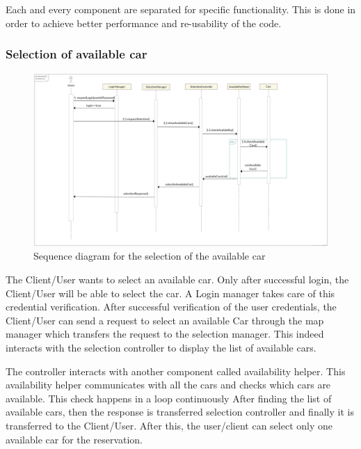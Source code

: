 Each and every component are separated for specific functionality. This is done in order to achieve better performance and re-usability of the code.

\subsubsection{Selection of available car}
\begin{figure}[h]
	\centering
	\includegraphics[width=\linewidth,keepaspectratio]{figures/selection_available_car_runtime.eps}
	\caption{Sequence diagram for the selection of the available car}
	\label{fig:selection_available_car_runtime}
\end{figure}

The Client/User wants to select an available car. Only after successful login, the Client/User will be able to select the car. A Login manager takes care of this credential verification.
After successful verification of the user credentials, the Client/User can send a request to select an available Car through the map manager which transfers the request to the selection
manager. This indeed interacts with the selection controller to display the list of available cars.

The controller interacts with another component called availability helper.
This availability helper communicates with all the cars and checks which cars are available. This check happens in a loop continuously After finding the list of available cars, then the response is transferred selection controller and finally it is transferred to the Client/User. After this, the user/client can select only one available car for the reservation.

